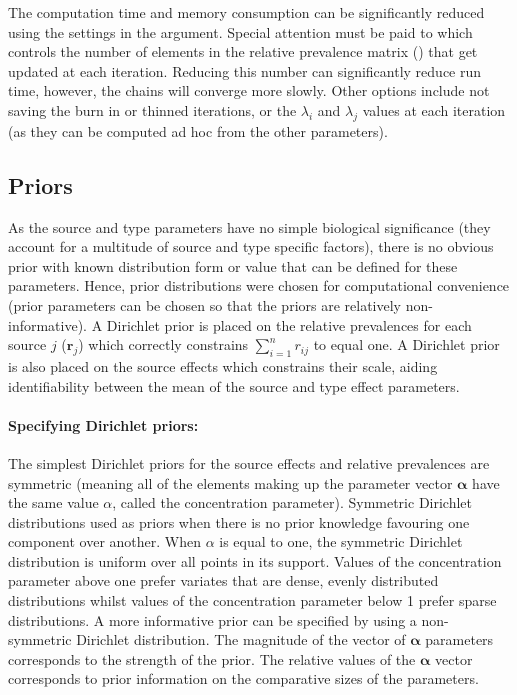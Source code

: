 The computation time and memory consumption can be significantly reduced using 
the settings in the  argument. Special attention must be paid to  which 
controls the number of elements in the relative prevalence matrix () that get updated at each 
iteration. Reducing this number can significantly reduce run time, however, the chains will converge more 
slowly. Other options include not saving the burn in or thinned iterations, or the $\lambda_i$ and $\lambda_j$ values at each iteration (as they can be computed ad hoc from the other parameters).

\subsection{Priors} \label{priors_section}

As the source and type parameters have no simple biological significance (they account for a multitude of source and type specific factors), there is no obvious prior with known distribution form or 
value that can be defined for these parameters. Hence, prior distributions were chosen for computational convenience (prior parameters can be chosen so that the priors are relatively non-
informative). A Dirichlet prior is placed on the relative prevalences for each source $j$ ($\mathbf{r}_j$) which correctly constrains $\sum_{i=1} ^n r_{ij}$ to equal one. A Dirichlet prior is also placed on 
the source effects which constrains their scale, aiding identifiability between the mean of the source and type effect parameters. 

\paragraph{Specifying Dirichlet priors:}
The simplest Dirichlet priors for the source effects and relative prevalences are symmetric (meaning all of the elements making up the parameter vector $\bm\alpha$ have the same value $\alpha$, called the concentration parameter). Symmetric Dirichlet distributions used as priors when there is no prior knowledge favouring one component over another. When $\alpha$ is equal to one, the symmetric Dirichlet distribution is uniform over all points in its support. Values of the concentration parameter above one prefer variates that are dense, evenly distributed distributions whilst values of the concentration parameter below 1 prefer sparse distributions. A more informative prior can be specified by using a non-symmetric Dirichlet distribution. The magnitude of the vector of $\bm\alpha$ parameters corresponds to the strength of the prior. The relative values of the $\bm\alpha$ vector corresponds to prior information on the comparative sizes of the parameters.

